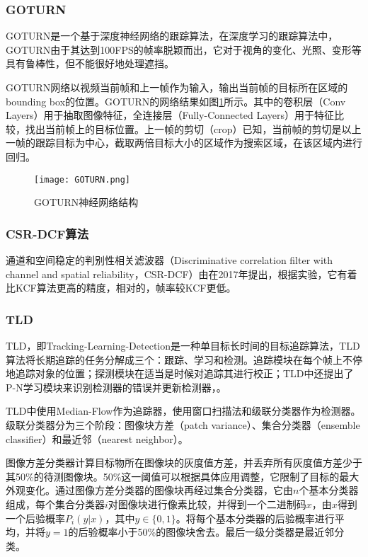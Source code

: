 \subsubsection{GOTURN}

  GOTURN是一个基于深度神经网络的跟踪算法\cite{held2016learning}，在深度学习的跟踪算法中，GOTURN由于其达到100FPS的帧率脱颖而出，它对于视角的变化、光照、变形等具有鲁棒性，但不能很好地处理遮挡。

  GOTURN网络以视频当前帧和上一帧作为输入，输出当前帧的目标所在区域的bounding box的位置。GOTURN的网络结果如图\ref{fig:GOTURN}所示。其中的卷积层（Conv Layers）用于抽取图像特征，全连接层（Fully-Connected Layers）用于特征比较，找出当前帧上的目标位置。上一帧的剪切（crop）已知，当前帧的剪切是以上一帧的跟踪目标为中心，截取两倍目标大小的区域作为搜索区域，在该区域内进行回归。

\begin{figure}[htb]
  \centering
  \texttt{[image: GOTURN.png]}
  \caption{GOTURN神经网络结构}
  \label{fig:GOTURN}
\end{figure}

\subsubsection{CSR-DCF算法}
  通道和空间稳定的判别性相关滤波器（Discriminative correlation filter with channel and spatial reliability，CSR-DCF）由\citet{lukezic2017discriminative}在2017年提出，根据实验，它有着比KCF算法更高的精度，相对的，帧率较KCF更低。

\subsubsection{TLD}

  TLD，即Tracking-Learning-Detection是一种单目标长时间的目标追踪算法，TLD算法将长期追踪的任务分解成三个：跟踪、学习和检测。追踪模块在每个帧上不停地追踪对象的位置；探测模块在适当是时候对追踪其进行校正；TLD中还提出了P-N学习模块来识别检测器的错误并更新检测器，\cite{kalal2012tracking}。

  TLD中使用Median-Flow作为追踪器，使用窗口扫描法和级联分类器作为检测器。级联分类器分为三个阶段：图像块方差（patch variance）、集合分类器（ensemble classifier）和最近邻（nearest neighbor）。

  图像方差分类器计算目标物所在图像块的灰度值方差，并丢弃所有灰度值方差少于其50\%的待测图像块。50\%这一阈值可以根据具体应用调整，它限制了目标的最大外观变化。通过图像方差分类器的图像块再经过集合分类器，它由$n$个基本分类器组成，每个集合分类器$i$对图像块进行像素比较，并得到一个二进制码$x$，由$x$得到一个后验概率$P_i(y|x)$，其中$y\in\{0,1\}$。将每个基本分类器的后验概率进行平均，并将$y=1$的后验概率小于50\%的图像块舍去。最后一级分类器是最近邻分类。

